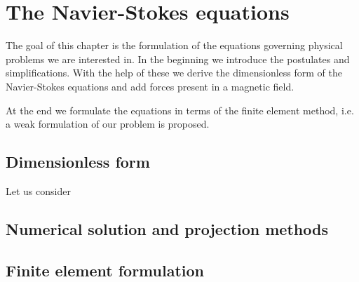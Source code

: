 \chapter{The Navier-Stokes equations}

\par The goal of this chapter is the formulation of the equations governing physical problems we are interested in.
In the beginning we introduce the postulates and simplifications. With the help of these we derive the dimensionless form of the Navier-Stokes equations
and add forces present in a magnetic field.
\par At the end we formulate the equations in terms of the finite element method, i.e. a weak formulation of our problem is proposed.

\section{Dimensionless form}

\par Let us consider 

\section{Numerical solution and projection methods}
\section{Finite element formulation}

